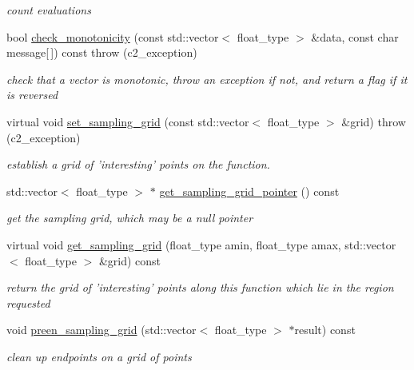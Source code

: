 \begin{DoxyCompactItemize}
\begin{DoxyCompactList}\small\item\em count evaluations \end{DoxyCompactList}\item 
bool \hyperlink{classc2__function_a8fffb02df5bbff25b0fde67115eae196}{check\-\_\-monotonicity} (const std\-::vector$<$ float\-\_\-type $>$ \&data, const char message\mbox{[}$\,$\mbox{]}) const   throw (c2\-\_\-exception)
\begin{DoxyCompactList}\small\item\em check that a vector is monotonic, throw an exception if not, and return a flag if it is reversed \end{DoxyCompactList}\item 
virtual void \hyperlink{classc2__function_a23828c75121b442899ab7a80cf5abbb0}{set\-\_\-sampling\-\_\-grid} (const std\-::vector$<$ float\-\_\-type $>$ \&grid)  throw (c2\-\_\-exception)
\begin{DoxyCompactList}\small\item\em establish a grid of 'interesting' points on the function. \end{DoxyCompactList}\item 
std\-::vector$<$ float\-\_\-type $>$ $\ast$ \hyperlink{classc2__function_a78b0427521403da116691bab7695906a}{get\-\_\-sampling\-\_\-grid\-\_\-pointer} () const 
\begin{DoxyCompactList}\small\item\em get the sampling grid, which may be a null pointer \end{DoxyCompactList}\item 
virtual void \hyperlink{classc2__function_ad03264dcc015e5d0b1b6eb30df3f32be}{get\-\_\-sampling\-\_\-grid} (float\-\_\-type amin, float\-\_\-type amax, std\-::vector$<$ float\-\_\-type $>$ \&grid) const 
\begin{DoxyCompactList}\small\item\em return the grid of 'interesting' points along this function which lie in the region requested \end{DoxyCompactList}\item 
void \hyperlink{classc2__function_a3f461317f09a62101e6114fd693fa20c}{preen\-\_\-sampling\-\_\-grid} (std\-::vector$<$ float\-\_\-type $>$ $\ast$result) const 
\begin{DoxyCompactList}\small\item\em clean up endpoints on a grid of points \end{DoxyCompactList}\item 

\end{DoxyCompactItemize}
